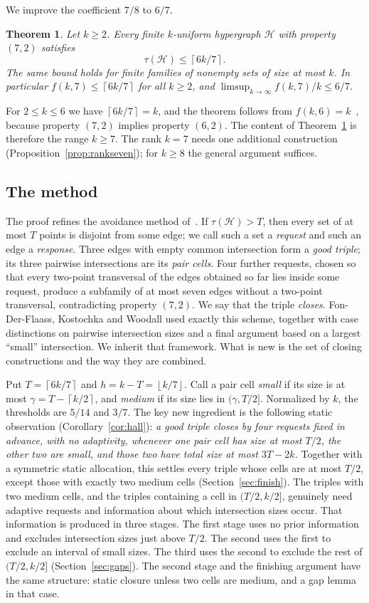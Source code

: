 \documentclass[11pt]{article}
\numberwithin{equation}{section}
\newtheorem{theorem}{Theorem}[section]
\theoremstyle{definition}
\theoremstyle{remark}
\newcommand{\HH}{\mathcal H}
\newcommand{\ceil}[1]{\left\lceil #1\right\rceil}
\newcommand{\floor}[1]{\left\lfloor #1\right\rfloor}
\begin{document}
We improve the coefficient $7/8$ to $6/7$.

\begin{theorem}\label{thm:main}
Let $k\ge2$. Every finite $k$-uniform hypergraph $\HH$ with property
$(7,2)$ satisfies
\[
 \tau(\HH)\le\ceil{6k/7}.
\]
The same bound holds for finite families of nonempty sets of size at
most $k$. In particular $f(k,7)\le\ceil{6k/7}$ for all $k\ge2$, and
$\limsup_{k\to\infty}f(k,7)/k\le6/7$.
\end{theorem}

For $2\le k\le6$ we have $\ceil{6k/7}=k$, and the theorem follows from
$f(k,6)=k$~\cite{EFKT}, because property $(7,2)$ implies property
$(6,2)$. The content of Theorem~\ref{thm:main} is therefore the range
$k\ge7$. The rank $k=7$ needs one additional construction
(Proposition~\ref{prop:rankseven}); for $k\ge8$ the general argument
suffices.

\subsection*{The method}
The proof refines the avoidance method of~\cite{FKW}. If
$\tau(\HH)>T$, then every set of at most $T$ points is disjoint from
some edge; we call such a set a \emph{request} and such an edge a
\emph{response}. Three edges with empty common intersection form a
\emph{good triple}; its three pairwise intersections are its \emph{pair
cells}. Four further requests, chosen so that every two-point
transversal of the edges obtained so far lies inside some request,
produce a subfamily of at most seven edges without a two-point
transversal, contradicting property $(7,2)$. We say that the triple
\emph{closes}. Fon-Der-Flaass, Kostochka and Woodall used exactly this
scheme, together with case distinctions on pairwise intersection sizes
and a final argument based on a largest ``small'' intersection. We
inherit that framework. What is new is the set of closing constructions
and the way they are combined.

Put $T=\ceil{6k/7}$ and $h=k-T=\floor{k/7}$. Call a pair cell
\emph{small} if its size is at most $\gamma=T-\ceil{k/2}$, and
\emph{medium} if its size lies in $(\gamma,T/2]$. Normalized by $k$, the
thresholds are $5/14$ and $3/7$. The key new ingredient is the
following static observation (Corollary~\ref{cor:hall}): \emph{a good
triple closes by four requests fixed in advance, with no adaptivity,
whenever one pair cell has size at most $T/2$, the other two are small,
and those two have total size at most $3T-2k$.} Together with a
symmetric static allocation, this settles every triple whose cells are
at most $T/2$, except those with exactly two medium cells
(Section~\ref{sec:finish}). The triples with two medium cells, and the
triples containing a cell in $(T/2,k/2]$, genuinely need adaptive
requests and information about which intersection sizes occur. That
information is produced in three stages. The first stage uses no prior
information and excludes intersection sizes just above $T/2$. The
second uses the first to exclude an interval of small sizes. The third
uses the second to exclude the rest of $(T/2,k/2]$
(Section~\ref{sec:gaps}). The second stage and the finishing argument
have the same structure: static closure unless two cells are medium,
and a gap lemma in that case.
\end{document}

